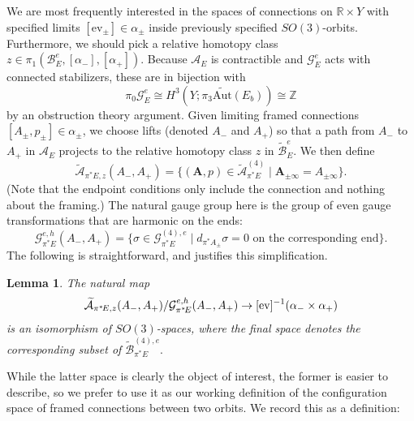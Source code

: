 \documentclass[10pt,a4paper]{amsart}
\newcommand{\pE}{\pi^* \! E}
\newtheorem{lemma}[theorem]{Lemma}
\theoremstyle{definition}
\theoremstyle{remark}
\numberwithin{figure}{qchap}
\begin{document}
\noindent We are most frequently interested in the spaces of connections on $\mathbb R \times Y$ with specified limits $[\text{ev}_{\pm}] \in \alpha_\pm$ inside previously specified $SO(3)$-orbits. Furthermore, we should pick a relative homotopy class $z \in \pi_1(\mathcal B^e_E, [\alpha_-], [\alpha_+])$. Because $\mathcal A_E$ is contractible and $\mathcal G^e_E$ acts with connected stabilizers, these are in bijection with $$\pi_0 \mathcal G^e_E \cong H^3(Y;\pi_3 \widetilde{\text{Aut}}(E_b)) \cong \mathbb Z$$ by an obstruction theory argument. Given limiting framed connections $[A_\pm,p_\pm] \in \alpha_\pm$, we choose lifts (denoted $A_-$ and $A_+$) so that a path from $A_-$ to $A_+$ in $\mathcal A_E$ projects to the relative homotopy class $z$ in $\widetilde{\mathcal B}^e_E$. We then define $$\widetilde{\mathcal A}_{\pE,z}(A_-, A_+) = \{(\mathbf{A},p) \in \widetilde{\mathcal A}^{(4)}_{\pE} \mid \mathbf{A}_{\pm \infty} = A_{\pm \infty}\}.$$ (Note that the endpoint conditions only include the connection and nothing about the framing.) The natural gauge group here is the group of even gauge transformations that are harmonic on the ends: $$\mathcal G^{e,h}_{\pE}(A_-, A_+) = \{\sigma \in \mathcal G^{(4),e}_{\pE} \mid d_{\pi^*A_{\pm}} \sigma = 0 \text{ on the corresponding end}\}.$$ The following is straightforward, and justifies this simplification. 

\begin{lemma}The natural map $$\widetilde{\mathcal A}_{\pE, z}(A_-, A_+)/\mathcal G^{e,h}_{\pE}(A_-, A_+) \to [\textup{ev}]^{-1}(\alpha_- \times \alpha_+)$$ is an isomorphism of $SO(3)$-spaces, where the final space denotes the corresponding subset of $\widetilde{\mathcal B}^{(4),e}_{\pE}.$ \end{lemma} 

While the latter space is clearly the object of interest, the former is easier to describe, so we prefer to use it as our working definition of the configuration space of framed connections between two orbits. We record this as a definition:
\end{document}
